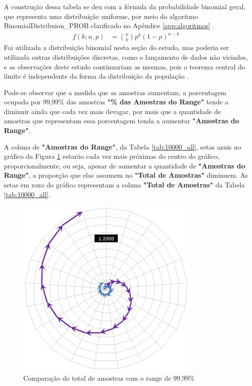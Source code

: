 A construção dessa tabela se deu com a fórmula da probabilidade binomial geral, que representa uma distribuição uniforme, por meio do algoritmo BinomialDistribuion\_PROB clarificado no Apêndice \ref{app:algoritmos} \cite{mathisfun_binomial_distribution}.
	\begin{align*}
	f(k;n,p) &= \binom{n}{k} p^k(1 - p)^{n-k}
	\end{align*}
Foi utilizada a distribuição binomial nesta seção do estudo, mas poderia ser utilizada outras distribuições discretas, como o lançamento de dados não viciados, e as observações deste estudo continuariam as mesmas, pois o teorema central do limite é independente da forma da distribuição da população \cite{statisticsbyjim_central_limite_theorem_explainded}.

Pode-se observar que a medida que as amostras aumentam, a porcentagem ocupada por 99,99\% das amostras \textbf{"\% das Amostras do Range"} tende a diminuir ainda que cada vez mais devagar, por mais que a quantidade de amostras que representam essa porcentagem tenda a aumentar \textbf{"Amostras do Range"}.

A coluna de \textbf{"Amostras do Range"}, da Tabela \ref{tab:10000_all}, setas azuis no gráfico da Figura \ref{fig:total_comparison_chart_with_99_range} estarão cada vez mais próximas do centro do gráfico, proporcionalmente, ou seja, apesar de aumentar a quantidade de \textbf{"Amostras do Range"}, a proporção que elas assumem no \textbf{"Total de Amostras"}  diminuem. As setas em roxo do gráfico representam a coluna \textbf{"Total de Amostras"} da Tabela \ref{tab:10000_all}. 
	\begin{figure}[H]
	\caption{Comparação do total de amostras com o range de 99,99\% }
	\label{fig:total_comparison_chart_with_99_range}
	\centering
	\includegraphics[scale=.9]{sections/images/total_comparison_chart_with_99_range.jpg}
	\end{figure}

